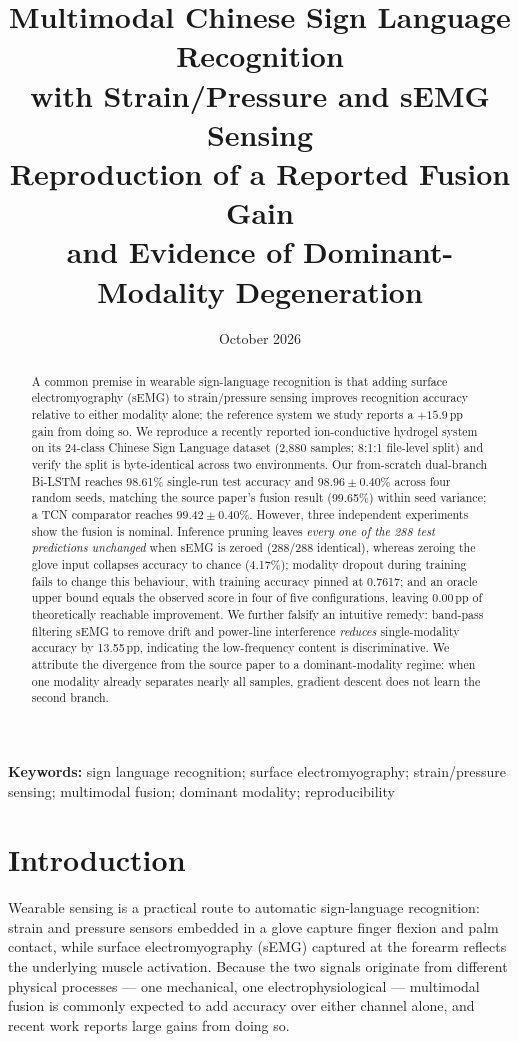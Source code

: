 \documentclass[11pt,a4paper]{article}
\title{\bfseries Multimodal Chinese Sign Language Recognition\\[2pt]
with Strain/Pressure and sEMG Sensing\\[10pt]
\normalfont\normalsize Reproduction of a Reported Fusion Gain\\[1pt]
and Evidence of Dominant-Modality Degeneration}
\author{}
\date{October 2026}
\begin{document}
\maketitle

\begin{abstract}
\noindent
A common premise in wearable sign-language recognition is that adding surface electromyography (sEMG) to strain/pressure sensing improves recognition accuracy relative to either modality alone; the reference system we study reports a $+15.9$\,pp gain from doing so. We reproduce a recently reported ion-conductive hydrogel system on its 24-class Chinese Sign Language dataset (2{,}880 samples; 8:1:1 file-level split) and verify the split is byte-identical across two environments. Our from-scratch dual-branch Bi-LSTM reaches 98.61\% single-run test accuracy and $98.96\pm0.40$\% across four random seeds, matching the source paper's fusion result (99.65\%) within seed variance; a TCN comparator reaches $99.42\pm0.40$\%. However, three independent experiments show the fusion is nominal. Inference pruning leaves \emph{every one of the 288 test predictions unchanged} when sEMG is zeroed (288/288 identical), whereas zeroing the glove input collapses accuracy to chance (4.17\%); modality dropout during training fails to change this behaviour, with training accuracy pinned at 0.7617; and an oracle upper bound equals the observed score in four of five configurations, leaving 0.00\,pp of theoretically reachable improvement. We further falsify an intuitive remedy: band-pass filtering sEMG to remove drift and power-line interference \emph{reduces} single-modality accuracy by 13.55\,pp, indicating the low-frequency content is discriminative. We attribute the divergence from the source paper to a dominant-modality regime: when one modality already separates nearly all samples, gradient descent does not learn the second branch.
\end{abstract}

\noindent\textbf{Keywords:} sign language recognition; surface electromyography; strain/pressure sensing; multimodal fusion; dominant modality; reproducibility

\section{Introduction}

Wearable sensing is a practical route to automatic sign-language recognition: strain and pressure sensors embedded in a glove capture finger flexion and palm contact, while surface electromyography (sEMG) captured at the forearm reflects the underlying muscle activation. Because the two signals originate from different physical processes --- one mechanical, one electrophysiological --- multimodal fusion is commonly expected to add accuracy over either channel alone, and recent work reports large gains from doing so.
\end{document}

